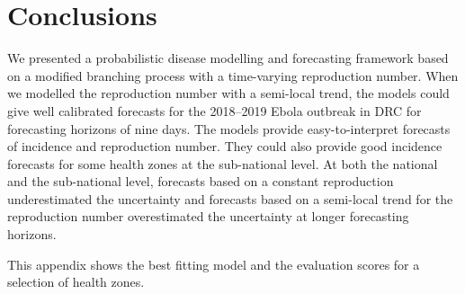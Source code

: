 \documentclass[12pt]{article}
\begin{document}
\section{Conclusions}
We presented a probabilistic disease modelling and forecasting framework based on a modified branching process with a time-varying reproduction number. When we modelled the reproduction number with a semi-local trend, the models could give well calibrated forecasts for the 2018--2019 Ebola outbreak in DRC for forecasting horizons of nine days. The models provide easy-to-interpret forecasts of incidence and reproduction number. They could also provide good incidence forecasts for some health zones at the sub-national level. At both the national and the sub-national level, forecasts based on a constant reproduction underestimated the uncertainty and forecasts based on a semi-local trend for the reproduction number overestimated the uncertainty at longer forecasting horizons. 


\newpage

 


\clearpage
\newpage

\appendix
\appendixpage
\addappheadtotoc
{}
This appendix shows the best fitting model and the evaluation scores for a selection of health zones.


\end{document}
